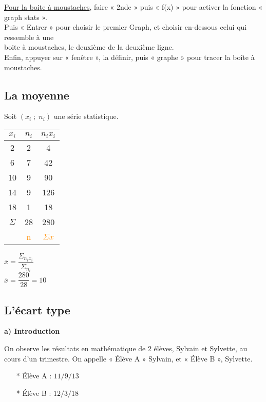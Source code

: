 \underline{Pour la boite à moustaches}, faire « 2nde » puis « f(x) » pour activer la fonction « graph stats ». \\ Puis « Entrer » pour choisir le premier Graph, et choisir en-dessous celui qui ressemble à une \\ boite à moustaches, le deuxième de la deuxième ligne. \\

Enfin, appuyer sur « fenêtre », la définir, puis « graphe » pour tracer la boîte à moustaches. 

\subsection{La moyenne}

Soit $\left(x_i \; ; \; n_i\right)$ une série statistique. \\ 

\begin{tabular}{c|c|c}
$x_i$ & $n_i$ & $n_ix_i$ \\
\hline
2 & 2 & 4	\\
6 & 7 & 42 \\
10 & 9 & 90 \\
14 & 9 & 126 \\
18 & 1 & 18 \\
\hline
$\Sigma$ & 28 & 280 \\
    & \textcolor{DarkOrange}{n} & \textcolor{DarkOrange}{$\Sigma x$} \\
\end{tabular}

\vspace{.3cm}

$\overline{x} = \dfrac{\Sigma_{n_ix_i}}{\Sigma_{n_i}} $ \\

$\overline{x} = \dfrac{280}{28} = 10 $

\newpage

\subsection{L'écart type}

\textbf{a) Introduction}

On observe les résultats en mathématique de 2 élèves, Sylvain et Sylvette, au cours d'un trimestre. On appelle « Élève A » Sylvain, et « Élève B », Sylvette. \\

\begin{itemize}
\item[*] Élève A : $ 11 / 9 / 13 $
\item[*] Élève B : $ 12 / 3 / 18 $
\end{itemize}

